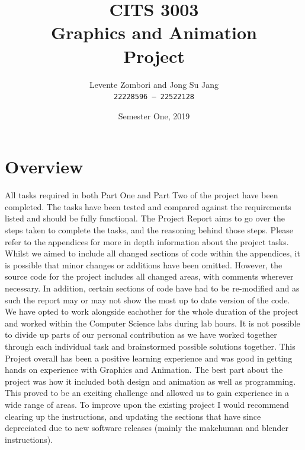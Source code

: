 \documentclass{article}
\title{CITS 3003 \\ Graphics and Animation \\ Project} %
\author{Levente Zombori and Jong Su Jang \\ \texttt{22228596 -- 22522128}} %
\date{Semester One, 2019} %
\begin{document}
\maketitle %

\section*{Overview} %
All tasks required in both Part One and Part Two of the project have been completed. The tasks have been tested and compared against the requirements listed and should be fully functional. 
\newline
\newline
The Project Report aims to go over the steps taken to complete the tasks, and the reasoning behind those steps. Please refer to the appendices for more in depth information about the project tasks. Whilst we aimed to include all changed sections of code within the appendices, it is possible that minor changes or additions have been omitted. However, the source code for the project includes all changed areas, with comments wherever necessary. In addition, certain sections of code have had to be re-modified and as such the report may or may not show the most up to date version of the code.
\newline
\newline
We have opted to work alongside eachother for the whole duration of the project and worked within the Computer Science labs during lab hours. It is not possible to divide up parts of our personal contribution as we have worked together through each individual task and brainstormed possible solutions together.
\newline
\newline
This Project overall has been a positive learning experience and was good in getting hands on experience with Graphics and Animation. The best part about the project was how it included both design and animation as well as programming. This proved to be an exciting challenge and allowed us to gain experience in a wide range of areas. To improve upon the existing project I would recommend clearing up the instructions, and updating the sections that have since depreciated due to new software releases (mainly the makehuman and blender instructions). 
\end{document}
